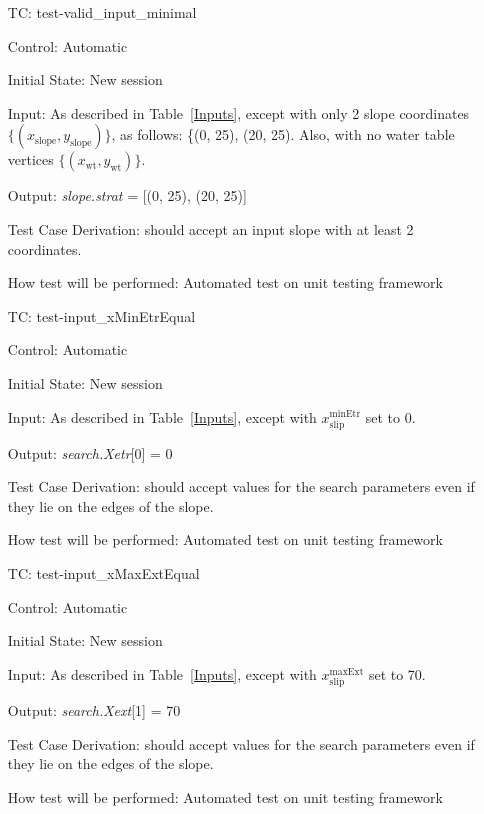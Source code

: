 \documentclass[12pt, titlepage]{article}
\newcounter{utestnum} %
\begin{document}
\begin{enumerate}[label=TC\arabic*:,ref={\arabic*}]
\item [TC\refstepcounter{utestnum}\theutestnum: \label{TC_InputMin}] 
test-valid\_input\_minimal

Control: Automatic

Initial State: New session

Input: As described in Table~\ref{Inputs}, except with only 
2 slope coordinates $\{\left(x_\text{slope},y_\text{slope}\right)\}$, as 
follows: 
\{(0, 25), (20, 25). Also, with no water table vertices 
$\{\left(x_\text{wt},y_\text{wt}\right)\}$.

Output: \textit{slope.strat} = [(0, 25), (20, 25)]

Test Case Derivation: \progname{} should accept an input slope with at least 2 
coordinates.

How test will be performed: Automated test on unit testing framework

\item [TC\refstepcounter{utestnum}\theutestnum: \label{TC_InputXMinEtrEqual}] 
test-input\_xMinEtrEqual

Control: Automatic

Initial State: New session

Input: As described in Table~\ref{Inputs}, except with  
${x_\text{slip}^\text{minEtr}}$ set to 0.

Output: \textit{search.Xetr}[0] = 0

Test Case Derivation: \progname{} should accept values for the search 
parameters even if they lie on the edges of the slope.

How test will be performed: Automated test on unit testing framework

\item [TC\refstepcounter{utestnum}\theutestnum: \label{TC_InputXMaxExtEqual}] 
test-input\_xMaxExtEqual

Control: Automatic

Initial State: New session

Input: As described in Table~\ref{Inputs}, except with 
${x_\text{slip}^\text{maxExt}}$ set to 70.

Output: \textit{search.Xext}[1] = 70

Test Case Derivation: \progname{} should accept values for the search 
parameters even if they lie on the edges of the slope.

How test will be performed: Automated test on unit testing framework
    
\end{enumerate}
\end{document}
